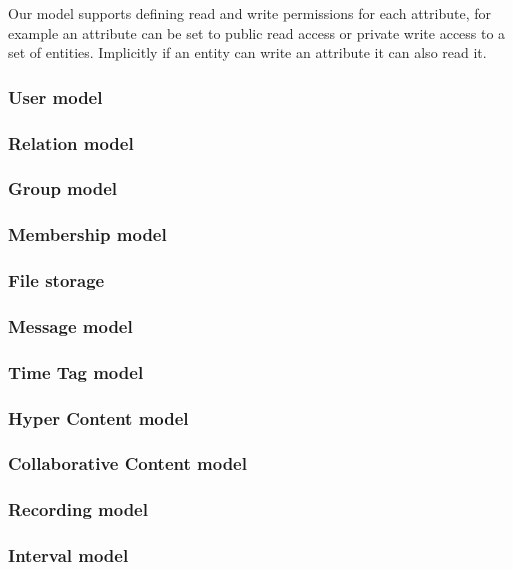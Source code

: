 Our model supports defining read and write permissions for each attribute, for example an attribute can be set to public read access or private write access to a set of entities. Implicitly if an entity can write an attribute it can also read it.

\subsubsection{User model}
\subsubsection{Relation model}
\subsubsection{Group model}
\subsubsection{Membership model}
\subsubsection{File storage}

\subsubsection{Message model}
\subsubsection{Time Tag model}
\subsubsection{Hyper Content model}
\subsubsection{Collaborative Content model}
\subsubsection{Recording model}
\subsubsection{Interval model}
